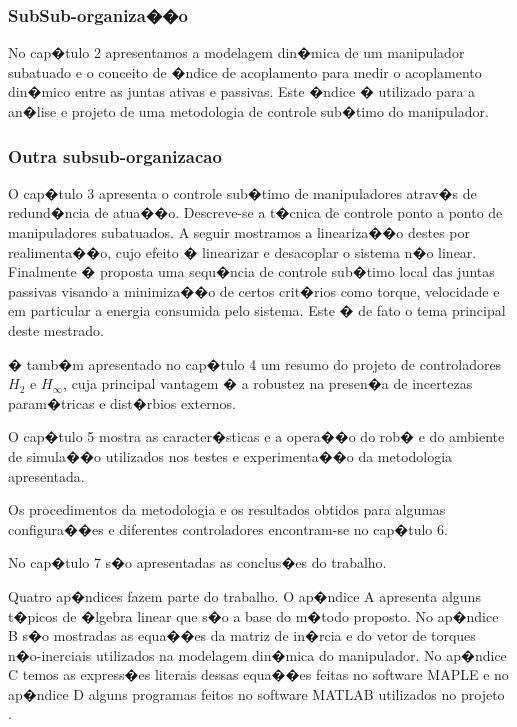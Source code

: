\subsubsection{SubSub-organiza��o}

No cap�tulo 2 apresentamos a modelagem din�mica de um manipulador subatuado e o conceito de �ndice de acoplamento para medir o acoplamento din�mico entre as juntas ativas e passivas. Este �ndice � utilizado para a an�lise e projeto de uma metodologia de controle sub�timo do manipulador.

\subsubsection{Outra subsub-organizacao}

O cap�tulo 3 apresenta o controle sub�timo de manipuladores atrav�s de redund�ncia de atua��o. Descreve-se a t�cnica de controle ponto a ponto de manipuladores subatuados. A seguir mostramos  a lineariza��o destes por realimenta��o, cujo efeito � linearizar e desacoplar o sistema n�o linear. Finalmente � proposta uma sequ�ncia de controle sub�timo local das juntas passivas visando a minimiza��o de certos crit�rios como torque, velocidade e em particular a energia consumida pelo sistema. Este � de fato o tema principal deste mestrado.

� tamb�m apresentado no cap�tulo 4 um resumo do projeto de controladores  $H_{2}$ e $H_{\infty}$, cuja principal vantagem � a robustez na presen�a de incertezas param�tricas e dist�rbios externos.

O cap�tulo 5 mostra as caracter�sticas e a opera��o do rob� e do ambiente de simula��o utilizados nos testes e experimenta��o da metodologia apresentada.

Os procedimentos da metodologia e os resultados obtidos para algumas configura��es e diferentes controladores encontram-se no cap�tulo 6.

No cap�tulo 7 s�o apresentadas as conclus�es do trabalho.

Quatro ap�ndices fazem parte do trabalho. O ap�ndice A apresenta alguns t�picos de �lgebra linear que s�o a base do m�todo proposto. No ap�ndice B s�o mostradas as equa��es da matriz de in�rcia e do vetor de torques n�o-inerciais
utilizados na modelagem din�mica do manipulador. No ap�ndice C temos as express�es literais dessas equa��es feitas no software MAPLE e no ap�ndice D alguns programas feitos no software MATLAB utilizados no projeto \cite{Furmento1995}\cite{Morgado2003}.

